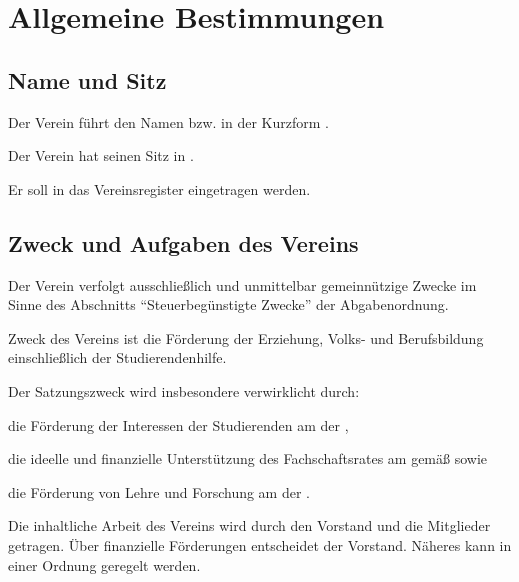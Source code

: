 \chapter{Allgemeine Bestimmungen}
\label{sec:Allg_Bestimmung}


\section{Name und Sitz}
	\begin{absätze}
		\item Der Verein führt den Namen \textit{\Vereinsname{}} bzw. in der Kurzform \textit{\VereinsnameKurz{}}.
		\item Der Verein hat seinen Sitz in \Stadt{}.
		\item Er soll in das Vereinsregister eingetragen werden.
	\end{absätze}

\section{Zweck und Aufgaben des Vereins}
	\begin{absätze}
		\item Der Verein verfolgt ausschließlich und unmittelbar gemeinnützige Zwecke im Sinne des Abschnitts "`Steuerbegünstigte Zwecke"' der Abgabenordnung.
		\item Zweck des Vereins ist die Förderung der Erziehung, Volks- und Berufsbildung einschließlich der Studierendenhilfe.
		\item Der Satzungszweck wird insbesondere verwirklicht durch:
		\begin{sätze}
			\item die Förderung der Interessen der Studierenden am \Fachbereich{} der \Uni{},
			\item die ideelle und finanzielle Unterstützung des Fachschaftsrates am \Fachbereich{} gemäß \VerweisFachschaftsrat{} sowie
			\item die Förderung von Lehre und Forschung am \Fachbereich{} der \Uni{}.
		\end{sätze}
		\item Die inhaltliche Arbeit des Vereins wird durch den Vorstand und die Mitglieder getragen. Über finanzielle Förderungen entscheidet der Vorstand. Näheres kann in einer Ordnung geregelt werden.
	\end{absätze}

